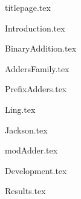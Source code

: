 \documentclass[a4paper,11pt]{article}
\numberwithin{equation}{section} %
\begin{document}
\sloppy


{titlepage.tex}

\newpage\null\thispagestyle{empty}\newpage

\tableofcontents
\clearpage

\listoffigures
\listoftables
\listofmyequations
\clearpage




{Introduction.tex}
\clearpage



{BinaryAddition.tex}
\clearpage



{AddersFamily.tex}
\clearpage



{PrefixAdders.tex}
\clearpage



{Ling.tex}
\clearpage



{Jackson.tex}
\clearpage



{modAdder.tex}
\clearpage




{Development.tex}
\clearpage



{Results.tex}
\clearpage








% 
% 
\printbibliography[
heading=bibintoc,
title={Βιβλιογραφία}
]
\end{document}
